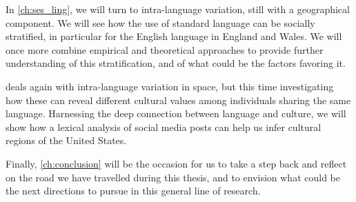 \documentclass[../thesis.tex]{subfiles}
\begin{document}
In \cref{ch:ses_ling}, we will turn to intra-language variation, still with a
geographical component.
We will see how the use of standard language can be socially stratified, in particular for the English language in England and Wales.
We will once more combine empirical and theoretical approaches to provide further understanding of this stratification, and of what could be the factors favoring it.

 deals again with intra-language variation in space, but this time
investigating how these can reveal different cultural values among individuals sharing
the same language.
Harnessing the deep connection between language and culture, we will show how a lexical analysis of social media posts can help us infer cultural regions of the United States.

Finally, \cref{ch:conclusion} will be the occasion for us to take a step back and reflect on the road
we have travelled during this thesis, and to envision what could be the next directions to pursue in this general line of research.
\end{document}
